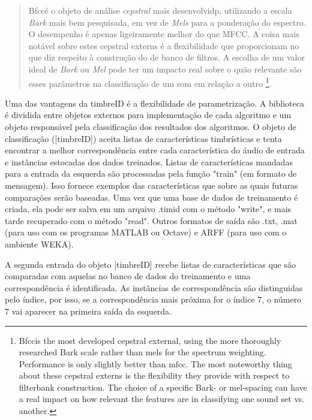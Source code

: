\documentclass{ppgmus}
\begin{document}
\begin{quote}
Bfcc\texttildelow é o objeto de análise \textit{cepstral} mais desenvolvidp, utilizando a escala \textit{Bark} 
mais bem pesquisada, em vez de \textit{Mels} para a ponderação do espectro. O desempenho é apenas ligeiramente melhor do 
que MFCC\texttildelow. A coisa mais notável sobre estes cepstral externs é a flexibilidade que proporcionam no 
que diz respeito à construção do de banco de filtros. A escolha de um valor ideal de \textit{Bark} ou \textit{Mel} 
 pode ter um impacto real sobre o quão relevante são esses parâmetros na classificação de um som em relação a outro
\footnote{Bfcc\texttildelow is the most developed cepstral external, using the more thoroughly researched Bark scale rather than mels for 
the spectrum weighting. Performance is only slightly better than mfcc\texttildelow. The most noteworthy thing about these cepstral 
externs is the flexibility they provide with respect to filterbank construction. The choice of a specific Bark- or 
mel-spacing can have a real impact on how relevant the features are in classifying one sound set vs. another.}. 
\cite{brentcepstral}
 
\end{quote}


Uma das vantagens da timbreID é a flexibilidade de parametrização. A biblioteca é dividida
entre objetos externos para implementação de cada algoritmo e um objeto responsável pela
classificação dos resultados dos algoritmos. O objeto de classificação ([timbreID]) aceita
listas de características timbrísticas e tenta encontrar a melhor correspondência entre cada 
característica do áudio de entrada e instâncias estocadas dos dados treinados.
Listas de características mandadas para a entrada da esquerda são processadas pela função
"train" (em formato de mensagem). Isso fornece exemplos das características que sobre as quais
futuras comparações serão baseadas. Uma vez que uma base de dados de treinamento é criada, ela
pode ser salva em um arquivo .timid com o método "write", e mais tarde recuperado com o método
"read". Outros formatos de saída são .txt, .mat (para uso com os programas MATLAB ou Octave)
e ARFF (para uso com o ambiente WEKA).

A segunda entrada do objeto [timbreID] recebe listas de características que são comparadas com
aquelas no banco de dados do treinamento e uma correspondência é identificada. As instâncias de 
correspondência são distinguidas pelo índice, por isso, se a correspondência mais próxima for o 
índice 7, o número 7 vai aparecer na primeira saída da esquerda.
\end{document}
